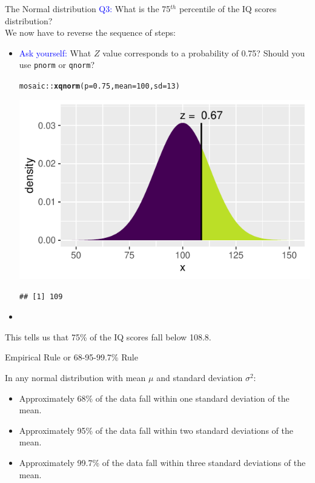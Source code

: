 \documentclass[10pt,handout]{beamer}\usepackage[]{graphicx}\usepackage[]{color}
\makeatletter
\newcommand{\hlnum}[1]{\textcolor[rgb]{0.686,0.059,0.569}{#1}}%
\newcommand{\hlopt}[1]{\textcolor[rgb]{0,0,0}{#1}}%
\newcommand{\hlstd}[1]{\textcolor[rgb]{0.345,0.345,0.345}{#1}}%
\newcommand{\hlkwc}[1]{\textcolor[rgb]{0.333,0.667,0.333}{#1}}%
\newcommand{\hlkwd}[1]{\textcolor[rgb]{0.737,0.353,0.396}{\textbf{#1}}}%
\newenvironment{kframe}{%
 \def\at@end@of@kframe{}%
 \ifinner\ifhmode%
  \def\at@end@of@kframe{\end{minipage}}%
  \begin{minipage}{\columnwidth}%
 \fi\fi%
 \def\FrameCommand##1{\hskip\@totalleftmargin \hskip-\fboxsep
 \colorbox{shadecolor}{##1}\hskip-\fboxsep
     \hskip-\linewidth \hskip-\@totalleftmargin \hskip\columnwidth}%
 \MakeFramed {\advance\hsize-\width
   \@totalleftmargin\z@ \linewidth\hsize
   \@setminipage}}%
 {\par\unskip\endMakeFramed%
 \at@end@of@kframe}
\newenvironment{knitrout}{}{} %
\makeatother
\begin{document}
\begin{frame}[fragile]{The Normal distribution}
	\textcolor{blue}{Q3:}
	What is the 75$^{th}$ percentile of the IQ scores distribution? \\
	We now have to reverse the sequence of steps: \pause
	\begin{itemize}
		\item \textcolor{blue}{Ask yourself:} What $Z$ value corresponds to a probability of 0.75? Should you use \texttt{pnorm} or \texttt{qnorm}? \pause
		
\begin{knitrout}\tiny
{}\color{fgcolor}\begin{kframe}
\begin{alltt}
\hlstd{mosaic}\hlopt{::}\hlkwd{xqnorm}\hlstd{(}\hlkwc{p} \hlstd{=} \hlnum{0.75}\hlstd{,} \hlkwc{mean} \hlstd{=} \hlnum{100}\hlstd{,} \hlkwc{sd} \hlstd{=} \hlnum{13}\hlstd{)}
\end{alltt}
\end{kframe}

{\centering \includegraphics[width=0.6\linewidth]{figure/probs8-1} 

}


\begin{kframe}\begin{verbatim}
## [1] 109
\end{verbatim}
\end{kframe}
\end{knitrout}
		
		\item[]
	\end{itemize} This tells us that 75\% of the IQ scores fall below 108.8. 
\end{frame}


\begin{frame}[fragile]{Empirical Rule or 68-95-99.7\% Rule}
	
	In any normal distribution with mean $\mu$ and standard deviation $\sigma^2$:
	\begin{itemize}
		\setlength\itemsep{2em}
		\item Approximately 68\% of the data fall within one standard deviation of the mean.
		\item Approximately 95\% of the data fall within two standard deviations of the mean.
		\item Approximately 99.7\% of the data fall within three standard deviations of the mean.
	\end{itemize}
\end{frame}
\end{document}
